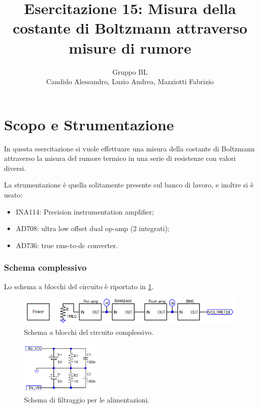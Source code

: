 \documentclass[a4paper,10pt]{article}
\title{Esercitazione 15: Misura della costante di Boltzmann attraverso misure di rumore}
\author{Gruppo BL \\ Candido Alessandro, Luzio Andrea, Mazziotti Fabrizio}
\begin{document}
\maketitle

\vspace*{-20pt}

\section{Scopo e Strumentazione}
In questa esercitazione si vuole effettuare una misura della costante di Boltzmann attraverso la
misura del rumore termico in una serie di resistenze con valori diversi.

\noindent La strumentazione è quella solitamente presente sul banco di lavoro, e inoltre si è usato:
\begin{itemize}
	\item INA114: Precision instrumentation amplifier;
	\item AD708: ultra low offset dual op-amp (2 integrati);
	\item AD736: true rms-to-dc converter.
\end{itemize}

\subsubsection*{Schema complessivo}

Lo schema a blocchi del circuito è riportato in \cref{fig:blocks}.

\begin{figure}[H]
	\centering
	\includegraphics[width=\textwidth]{../grafici/Blocks.png}
	\vspace*{-15pt}
	\caption{Schema a blocchi del circuito complessivo.}
	\label{fig:blocks}
\end{figure}

\begin{figure}
	\vspace{-10pt}
	\centering
	\includegraphics[width=0.35\textwidth]{../grafici/Filter.png}
	\vspace{-6pt}
	\caption{Schema di filtraggio per le alimentazioni.}
	\label{fig:powfilter}
	\vspace{-12pt}
\end{figure}
\end{document}
